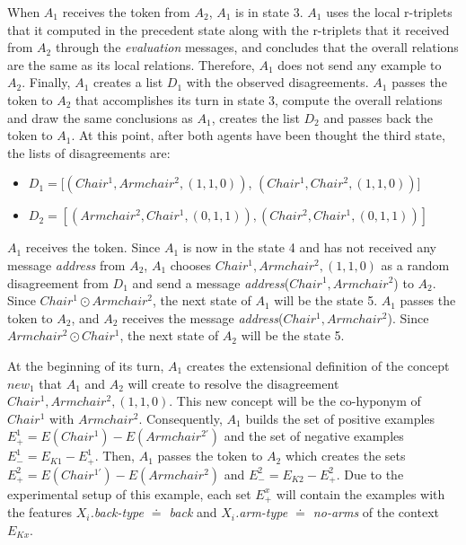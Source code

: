 When $A_{1}$ receives the token from $A_{2}$, $A_{1}$ is in state 3. $A_{1}$ uses the local r-triplets that it computed in the precedent state along with the r-triplets that it received from $A_{2}$ through the \emph{evaluation} messages, and concludes that the overall relations are the same as its local relations. Therefore, $A_{1}$ does not send any example to $A_{2}$. Finally, $A_{1}$ creates a list $D_{1}$ with the observed disagreements. $A_{1}$ passes the token to $A_{2}$ that accomplishes its turn in state 3, compute the overall relations and draw the same conclusions as $A_{1}$, creates the list $D_{2}$ and passes back the token to $A_{1}$. At this point, after both agents have been thought the third state, the lists of disagreements are:

\begin{itemize}
    \item $D_{1} = [(Chair^{1}, Armchair^{2}, (1,1,0))$, $(Chair^{1}, Chair^{2}, (1,1,0))]$
    \item $D_{2}= [(Armchair^{2}, Chair^{1}, (0,1,1)), (Chair^{2}, Chair^{1}, (0,1,1))]$
\end{itemize}

$A_{1}$ receives the token. Since $A_{1}$ is now in the state 4 and has not received any message \emph{address} from $A_{2}$, $A_{1}$ chooses $Chair^{1}, Armchair^{2}, (1,1,0)$ as a random disagreement from $D_{1}$ and send a message \emph{address}($Chair^{1}, Armchair^{2}$) to $A_{2}$. Since $Chair^{1} \odot Armchair^{2}$, the next state of $A_{1}$ will be the state 5. $A_{1}$ passes the token to $A_{2}$, and $A_{2}$ receives the message \emph{address}($Chair^{1}, Armchair^{2}$). Since $Armchair^{2} \odot Chair^{1}$, the next state of $A_{2}$ will be the state 5.

At the beginning of its turn, $A_{1}$ creates the extensional definition of the concept $new_1$ that $A_{1}$ and $A_{2}$ will create to resolve the disagreement $Chair^{1}, Armchair^{2}, (1,1,0)$. This new concept will be the co-hyponym of $Chair^{1}$ with $Armchair^{2}$. Consequently, $A_{1}$ builds the set of positive examples $E^{1}_{+} = E(Chair^{1}) - E(Armchair^{2'})$ and the set of negative examples $E^{1}_{-} = E_{K1} - E^{1}_{+}$. Then, $A_{1}$ passes the token to $A_{2}$ which creates the sets $E^{2}_{+} = E(Chair^{1'}) - E(Armchair^{2})$ and $E^{2}_{-} = E_{K2} - E^{2}_{+}$. Due to the experimental setup of this example, each set $E^{x}_{+}$ will contain the examples with the features \emph{$X_{i}$.back-type $\doteq$ back} and \emph{$X_{i}$.arm-type $\doteq$ no-arms} of the context $E_{Kx}$.

